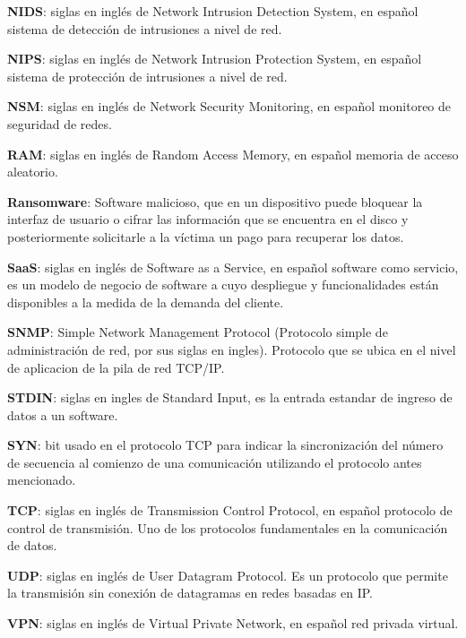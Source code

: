 \textbf{NIDS}: siglas en inglés de Network Intrusion Detection System, en español sistema de detección de intrusiones a nivel de red. \par

\textbf{NIPS}: siglas en inglés de Network Intrusion Protection System, en español sistema de protección de intrusiones a nivel de red. \par

\textbf{NSM}: siglas en inglés de Network Security Monitoring, en español monitoreo de seguridad de redes. \par

\textbf{RAM}: siglas en inglés de Random Access Memory, en español memoria de acceso aleatorio. \par

\textbf{Ransomware}: Software malicioso, que en un dispositivo puede bloquear la interfaz de usuario o cifrar las información que se encuentra en el disco y posteriormente solicitarle a la víctima un pago para recuperar los datos. \par
\textbf{SaaS}: siglas en inglés de Software as a Service, en español software como servicio, es un modelo de negocio de software a cuyo despliegue y funcionalidades están disponibles a la medida de la demanda del cliente. \par

\textbf{SNMP}: Simple Network Management Protocol (Protocolo simple de administración de red, por sus siglas en ingles). Protocolo que se ubica en el nivel de aplicacion de la pila de red TCP/IP.  \par

\textbf{STDIN}: siglas en ingles de Standard Input, es la entrada estandar de ingreso de datos a un software.\par

\textbf{SYN}: bit usado en el protocolo TCP para indicar la sincronización del número de secuencia al comienzo de una comunicación utilizando el protocolo antes mencionado. \par

\textbf{TCP}: siglas en inglés de Transmission Control Protocol, en español protocolo de control de transmisión. Uno de los protocolos fundamentales en la comunicación de datos. \par

\textbf{UDP}: siglas en inglés de User Datagram Protocol. Es un protocolo que permite la transmisión sin conexión de datagramas en redes basadas en IP. \par

\textbf{VPN}: siglas en inglés de Virtual Private Network, en español red privada virtual. \par
